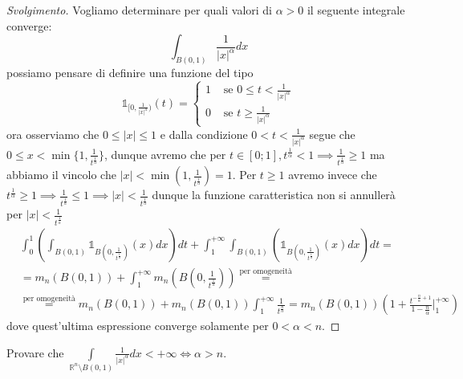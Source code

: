\begin{proof}[Svolgimento]
	Vogliamo determinare per quali valori di $\alpha > 0$ il seguente integrale converge:
	$$
	\int_{B(0, 1)} \frac{1}{|x|^\alpha} dx
	$$
	possiamo pensare di definire una funzione del tipo
	$$
	\mathbb{1}_{[0, \frac{1}{|x|^\alpha})}(t) = \begin{cases} 1 & \text{ se } 0 \leq t < \frac{1}{|x|^\alpha} \\
	0 & \text{ se } t \geq \frac{1}{|x|^\alpha}
	\end{cases}
	$$
	ora osserviamo che $0 \leq |x| \leq 1$ e dalla condizione $0 < t < \frac{1}{|x|^\alpha}$ segue che $0 \leq x < \min\{1, \frac{1}{t^{\frac{1}{\alpha}}} \}$, dunque avremo che per $t \in [0; 1], t^{\frac{1}{\alpha}} < 1 \implies \frac{1}{t^{\frac{1}{\alpha}}} \geq 1$ ma abbiamo il vincolo che $|x| < \min{(1, \frac{1}{t^{\frac{1}{\alpha}}})} = 1$. Per
	$t \geq 1$ avremo invece che $t^{\frac{1}{\alpha}} \geq 1 \implies \frac{1}{t^{\frac{1}{\alpha}}} \leq 1 \implies |x| < \frac{1}{t^{\frac{1}{\alpha}}}$ dunque la funzione caratteristica non si annullerà per $|x| < \frac{1}{t^{\frac{1}{\alpha}}}$
	\begin{align*}
	&\int_0^1 \left( \int_{B(0,1)} \mathbb{1}_{B \left(0, \frac{1}{t^{\frac{1}{\alpha}}} \right)}(x)dx \right)dt + \int_1^{+\infty} \int_{B(0,1)} \left( \mathbb{1}_{B \left(0, \frac{1}{t^{\frac{1}{\alpha}}} \right)}(x)dx	\right)dt = \\
	&=m_n(B(0, 1)) + \int_1^{+\infty} m_n \left(B \left(0, \frac{1}{t^{\frac{1}{\alpha}}} \right) \right) \stackrel{\text{per omogeneità}}{=} \\
	&\stackrel{\text{per omogeneità}}{=} m_n(B(0,1)) + m_n(B(0,1)) \int_1^{+\infty} \frac{1}{t^{\frac{n}{\alpha}}} = m_n(B(0,1))(1 + \frac{t^{-\frac{n}{\alpha} + 1}}{1 - \frac{n}{\alpha}}\Bigg|^{+\infty}_{1})
	\end{align*}
	dove quest'ultima espressione converge solamente per $0 < \alpha < n$.
\end{proof}
\begin{exercise}
Provare che $\int\limits_{\mathbb{R}^n \setminus B(0,1)} \frac{1}{|x|^\alpha}dx < +\infty \iff \alpha > n$.
\end{exercise}
